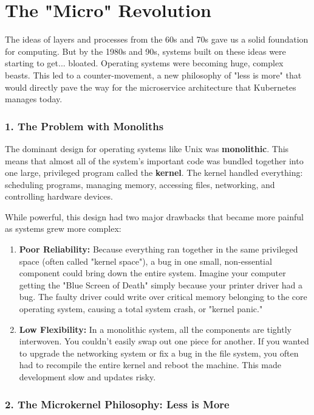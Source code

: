 \chapter{The "Micro" Revolution}


The ideas of layers and processes from the 60s and 70s gave us a solid foundation for computing. But by the 1980s and 90s, systems built on these ideas were starting to get... bloated. Operating systems were becoming huge, complex beasts. This led to a counter-movement, a new philosophy of "less is more" that would directly pave the way for the microservice architecture that Kubernetes manages today.


\subsection{1. The Problem with Monoliths}


The dominant design for operating systems like Unix was \textbf{monolithic}. This means that almost all of the system's important code was bundled together into one large, privileged program called the \textbf{kernel}. The kernel handled everything: scheduling programs, managing memory, accessing files, networking, and controlling hardware devices.

While powerful, this design had two major drawbacks that became more painful as systems grew more complex:

\begin{enumerate}
\item \textbf{Poor Reliability:} Because everything ran together in the same privileged space (often called "kernel space"), a bug in one small, non-essential component could bring down the entire system. Imagine your computer getting the "Blue Screen of Death" simply because your printer driver had a bug. The faulty driver could write over critical memory belonging to the core operating system, causing a total system crash, or "kernel panic."
\item \textbf{Low Flexibility:} In a monolithic system, all the components are tightly interwoven. You couldn't easily swap out one piece for another. If you wanted to upgrade the networking system or fix a bug in the file system, you often had to recompile the entire kernel and reboot the machine. This made development slow and updates risky.
\end{enumerate}


\subsection{2. The Microkernel Philosophy: Less is More}


